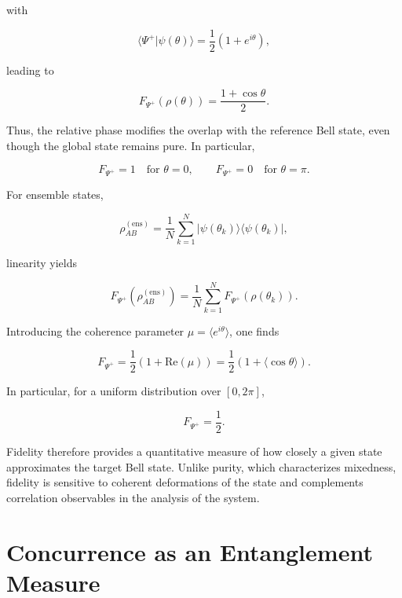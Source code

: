 with

\[
\langle \Psi^+|\psi(\theta)\rangle
=
\frac{1}{2}
\left(
1+e^{i\theta}
\right),
\]

leading to

\begin{equation}
F_{\Psi^+}(\rho(\theta))
=
\frac{1+\cos\theta}{2}.
\label{eq:phase_state_fidelity_psi_plus}
\end{equation}

\medskip

Thus, the relative phase modifies the overlap with the reference Bell state, even though the global state remains pure. In particular,

\[
F_{\Psi^+}=1
\quad
\text{for }
\theta=0,
\qquad
F_{\Psi^+}=0
\quad
\text{for }
\theta=\pi.
\]

\medskip

For ensemble states,

\[
\rho_{AB}^{(\mathrm{ens})}
=
\frac{1}{N}
\sum_{k=1}^{N}
|\psi(\theta_k)\rangle\langle\psi(\theta_k)|,
\]

linearity yields

\[
F_{\Psi^+}
\left(
\rho_{AB}^{(\mathrm{ens})}
\right)
=
\frac{1}{N}
\sum_{k=1}^{N}
F_{\Psi^+}
\left(
\rho(\theta_k)
\right).
\]

Introducing the coherence parameter \( \mu = \langle e^{i\theta}\rangle \), one finds

\begin{equation}
F_{\Psi^+}
=
\frac{1}{2}
\left(
1+\mathrm{Re}(\mu)
\right)
=
\frac{1}{2}
\left(
1+\langle \cos\theta\rangle
\right).
\label{eq:ensemble_fidelity_psi_plus}
\end{equation}

\medskip

In particular, for a uniform distribution over \( [0,2\pi] \),

\[
F_{\Psi^+}
=
\frac{1}{2}.
\]

\medskip

Fidelity therefore provides a quantitative measure of how closely a given state approximates the target Bell state. Unlike purity, which characterizes mixedness, fidelity is sensitive to coherent deformations of the state and complements correlation observables in the analysis of the system.


\section{Concurrence as an Entanglement Measure}

